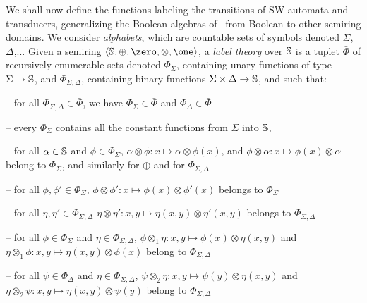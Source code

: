 %
%
We shall now define the functions labeling the transitions of SW automata and transducers,
generalizing the Boolean algebras of~\cite{dAntoniVeanes17CAV} 
from Boolean to other semiring domains.
%
We consider \emph{alphabets}, which are countable sets of symbols 
denoted $\Sigma$, $\Delta$,...
%
\noindent 
Given a semiring $\< \Semiring, \oplus, \zero, \otimes, \one>$, 
a \emph{label theory} over $\mathbb{S}$
is a tuplet $\bar\Phi$ of recursively enumerable sets denoted
$\Phi_\Sigma$, %
containing unary functions of type $\Sigma \to \mathbb{S}$, %
and $\Phi_{\Sigma, \Delta}$, containing binary functions $\Sigma \times \Delta \to \mathbb{S}$, 
and such that:

\noindent -- 
for all $\Phi_{\Sigma, \Delta} \in \bar\Phi$, we have
$\Phi_{\Sigma} \in \bar\Phi$ and $\Phi_{\Delta} \in \bar\Phi$

\noindent -- 
every $\Phi_{\Sigma}$ contains all the constant functions from $\Sigma$ into $\mathbb{S}$, 
 
\noindent -- 
for all $\alpha \in \mathbb{S}$ and $\phi \in \Phi_\Sigma$,
      $\alpha \otimes \phi : x \mapsto \alpha \otimes \phi(x)$, 
      and $\phi \otimes \alpha : x \mapsto \phi(x) \otimes \alpha$\\
\phantom{--} belong to $\Phi_\Sigma$, and similarly for $\oplus$ 
      and for $\Phi_{\Sigma, \Delta}$

\noindent -- 
for all $\phi, \phi' \in \Phi_\Sigma$,
$\phi \otimes \phi': x \mapsto \phi(x) \otimes \phi'(x)$ belongs to $\Phi_\Sigma$

\noindent -- 
for all $\eta, \eta' \in \Phi_{\Sigma, \Delta}$
$\eta \otimes \eta': x, y \mapsto \eta(x, y) \otimes \eta'(x, y)$ belongs to $\Phi_{\Sigma, \Delta}$

\noindent -- 
for all $\phi \in \Phi_\Sigma$ and $\eta \in \Phi_{\Sigma, \Delta}$,
$\phi \otimes_1 \eta: x, y \mapsto \phi(x) \otimes \eta(x, y)$ and\\
\phantom{--} $\eta \otimes_1 \phi: x, y \mapsto \eta(x, y) \otimes \phi(x)$
belong to $\Phi_{\Sigma, \Delta}$

\noindent -- 
for all $\psi \in \Phi_\Delta$ and $\eta \in \Phi_{\Sigma, \Delta}$,
$\psi \otimes_2 \eta: x, y \mapsto \psi(y) \otimes \eta(x, y)$ and\\
\phantom{--} $\eta \otimes_2 \psi: x, y \mapsto \eta(x, y) \otimes \psi(y)$ 
belong to $\Phi_{\Sigma, \Delta}$

